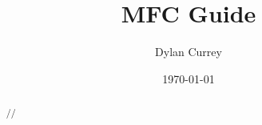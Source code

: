 \documentclass{article}
\begin{document}

\title{MFC Guide}
\author{Dylan Currey}
\date{\today}
\maketitle

\begin{abstract}
    //
\end{abstract}

\newpage

\tableofcontents
\listoffigures
\newpage
{}

%
\end{document}

